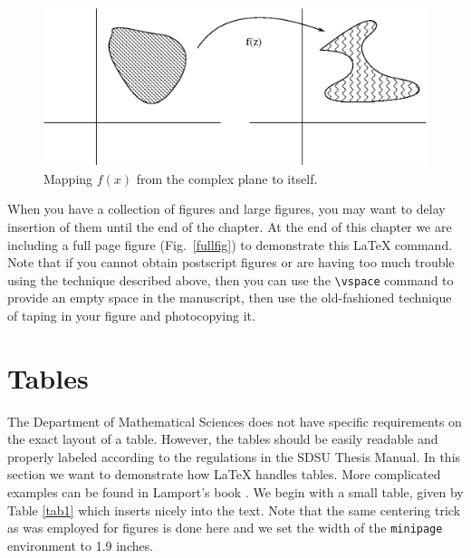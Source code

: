 \begin{figure}[ht]
  \centering
  \begin{minipage}{4.5in}
    \includegraphics[width=\linewidth]{Figures/mapping.eps}
    \caption{Mapping $f(x)$ from the complex plane to itself. \label{fig:graph}}
  \end{minipage}
\end{figure}


When you have a collection of figures and large figures, you may want
to delay insertion of them until the end of the chapter. At the end of
this chapter we are including a full page figure (Fig.~\ref{fullfig})
to demonstrate this \LaTeX{} command. Note that if you cannot obtain
postscript figures or are having too much trouble using the technique
described above, then you can use the \verb+\vspace+ command to
provide an empty space in the manuscript, then use the old-fashioned
technique of taping in your figure and photocopying it.

% 
% 


\section{Tables}

The Department of Mathematical Sciences does not have specific
requirements on the exact layout of a table. However, the tables
should be easily readable and properly labeled according to the
regulations in the SDSU Thesis Manual. In this section we want to
demonstrate how \LaTeX{} handles tables. More complicated examples can
be found in Lamport's book \cite{LAM,LAM2}. We begin with a small table,
given by Table \ref{tab1} which inserts nicely into the text.  Note
that the same centering trick as was employed for figures is done here
and we set the width of the \texttt{minipage} environment to 1.9
inches.
% 

